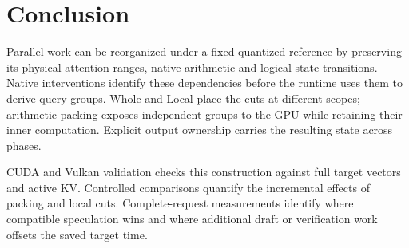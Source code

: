 \section{Conclusion}
Parallel work can be reorganized under a fixed quantized reference by preserving its physical attention ranges, native arithmetic and logical state transitions. Native interventions identify these dependencies before the runtime uses them to derive query groups. Whole and Local place the cuts at different scopes; arithmetic packing exposes independent groups to the GPU while retaining their inner computation. Explicit output ownership carries the resulting state across phases.

CUDA and Vulkan validation checks this construction against full target vectors and active KV. Controlled comparisons quantify the incremental effects of packing and local cuts. Complete-request measurements identify where compatible speculation wins and where additional draft or verification work offsets the saved target time.
